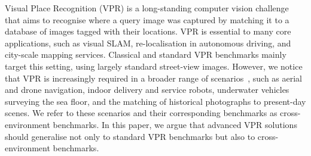 Visual Place Recognition (VPR) is a long-standing computer vision challenge that aims to recognise where a query image was captured by matching it to a database of images tagged with their locations. VPR is essential to many core applications, such as visual SLAM, re-localisation in autonomous driving, and city-scale mapping services. Classical and standard VPR benchmarks mainly target this setting, using largely standard street-view images. However, we notice that VPR is increasingly required in a broader range of scenarios~\citep{anyloc}, such as aerial and drone navigation, indoor delivery and service robots, underwater vehicles surveying the sea floor, and the matching of historical photographs to present-day scenes. We refer to these scenarios and their corresponding benchmarks as cross-environment benchmarks. In this paper, we argue that advanced VPR solutions should generalise not only to standard VPR benchmarks but also to cross-environment benchmarks.


